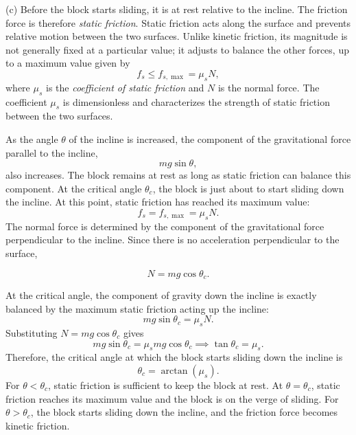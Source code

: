 \documentclass[../main.tex]{subfiles}
\begin{document}
(c) Before the block starts sliding, it is at rest relative to the incline. The friction force is therefore \emph{static friction}. Static friction acts along the surface and prevents relative motion between the two surfaces. Unlike kinetic friction, its magnitude is not generally fixed at a particular value; it adjusts to balance the other forces, up to a maximum value given by
\begin{equation}
f_s \leq f_{s,\max}=\mu_s N,
\end{equation}
where $\mu_s$ is the \emph{coefficient of static friction} and $N$ is the normal force. The coefficient $\mu_s$ is dimensionless and characterizes the strength of static friction between the two surfaces.

As the angle $\theta$ of the incline is increased, the component of the gravitational force parallel to the incline,
\begin{equation}
mg\sin\theta,
\end{equation}
also increases. The block remains at rest as long as static friction can balance this component. At the critical angle $\theta_c$, the block is just about to start sliding down the incline. At this point, static friction has reached its maximum value:
\begin{equation}
f_s=f_{s,\max}=\mu_sN.
\end{equation}
The normal force is determined by the component of the gravitational force perpendicular to the incline. Since there is no acceleration perpendicular to the surface,

\begin{equation}
N=mg\cos\theta_c.
\end{equation}

At the critical angle, the component of gravity down the incline is exactly balanced by the maximum static friction acting up the incline:
\begin{equation}
mg\sin\theta_c=\mu_sN.
\end{equation}
Substituting $N=mg\cos\theta_c$ gives
\begin{equation}
mg\sin\theta_c
=\mu_s mg\cos\theta_c \implies \tan\theta_c=\mu_s.
\end{equation}
Therefore, the critical angle at which the block starts sliding down the incline is
\begin{equation}
\boxed{\theta_c=\arctan(\mu_s)}.
\end{equation}
For $\theta<\theta_c$, static friction is sufficient to keep the block at rest. At $\theta=\theta_c$, static friction reaches its maximum value and the block is on the verge of sliding. For $\theta>\theta_c$, the block starts sliding down the incline, and the friction force becomes kinetic friction.
\end{document}

